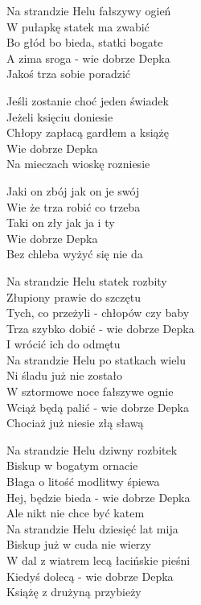\begin{text}
    Na strandzie Helu fałszywy ogień\\
    W pułapkę statek ma zwabić\\
    Bo głód bo bieda, statki bogate\\
    A zima sroga - wie dobrze Depka\\
    Jakoś trza sobie poradzić

    \vin Jeśli zostanie choć jeden świadek\\
    \vin Jeżeli księciu doniesie\\
    \vin Chłopy zapłacą gardłem a książę\\
    \vin Wie dobrze Depka\\
    \vin Na mieczach wioskę rozniesie

    \vin Jaki on zbój jak on je swój\\
    \vin Wie że trza robić co trzeba\\
    \vin Taki on zły jak ja i ty\\
    \vin Wie dobrze Depka\\
    \vin Bez chleba wyżyć się nie da

    Na strandzie Helu statek rozbity\\
    Złupiony prawie do szczętu\\
    Tych, co przeżyli - chłopów czy baby\\
    Trza szybko dobić - wie dobrze Depka\\
    I wrócić ich do odmętu\\
    \vin Na strandzie Helu po statkach wielu\\
    \vin Ni śladu już nie zostało\\
    \vin W sztormowe noce fałszywe ognie\\
    \vin Wciąż będą palić - wie dobrze Depka\\
    \vin Chociaż już niesie złą sławą

    Na strandzie Helu dziwny rozbitek\\
    Biskup w bogatym ornacie\\
    Błaga o litość modlitwy śpiewa\\
    Hej, będzie bieda - wie dobrze Depka\\
    Ale nikt nie chce być katem\\
    \vin Na strandzie Helu dziesięć lat mija\\
    \vin Biskup już w cuda nie wierzy\\
    \vin W dal z wiatrem lecą łacińskie pieśni\\
    \vin Kiedyś dolecą - wie dobrze Depka\\
    \vin Książę z drużyną przybieży


\end{text}
